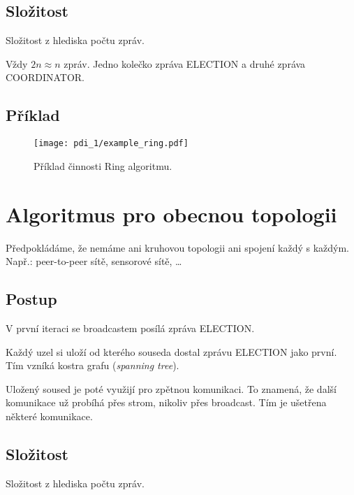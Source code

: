 \subsection*{Složitost}

Složitost z hlediska počtu zpráv.

\bigskip\noindent Vždy $2n \approx n$ zpráv. Jedno kolečko  zpráva ELECTION a druhé zpráva COORDINATOR.

\subsection*{Příklad}

\begin{figure}[H]
    \centering
    \texttt{[image: pdi\_1/example\_ring.pdf]}
    \caption{Příklad činnosti Ring algoritmu.}
\end{figure}


\section{Algoritmus pro obecnou topologii}

Předpokládáme, že nemáme ani kruhovou topologii ani spojení každý s každým. Např.: peer-to-peer sítě, sensorové sítě, \dots

\subsection*{Postup}

\begin{compactitem}
    \item V první iteraci se broadcastem posílá zpráva ELECTION.
    \item Každý uzel si uloží od kterého souseda dostal zprávu ELECTION jako první. Tím vzníká kostra grafu (\textit{spanning tree}).
    \item Uložený soused je poté využijí pro zpětnou komunikaci. To znamená, že další komunikace už probíhá přes strom, nikoliv přes broadcast. Tím je ušetřena některé komunikace.
\end{compactitem}

\subsection*{Složitost}

Složitost z hlediska počtu zpráv.

